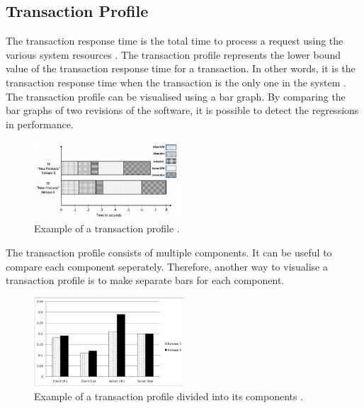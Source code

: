 \subsection{Transaction Profile}
The transaction response time is the total time to process a request using the various system resources \cite{jain2008art}. The transaction profile represents the lower bound value of the transaction response time for a transaction. In other words, it is the transaction response time when the transaction is the only one in the system \cite{ghaith2015anomaly}. The transaction profile can be visualised using a bar graph. By comparing the bar graphs of two revisions of the software, it is possible to detect the regressions in performance.

\begin{figure}[h]
\begin{center}
  \includegraphics[width=0.5\textwidth]{Figures/TP.png}
\end{center}
  \caption{ Example of a transaction profile \cite{ghaith2015anomaly}.}

\end{figure}

The transaction profile consists of multiple components. It can be useful to compare each component seperately. Therefore, another way to visualise a transaction profile is to make separate bars for each component.

\begin{figure}[h]
\begin{center}
  \includegraphics[width=0.5\textwidth]{Figures/TPbars.png}
\end{center}
  \caption{Example of a transaction profile divided into its components \cite{ghaith2015anomaly}.}

\end{figure}
\newpage
